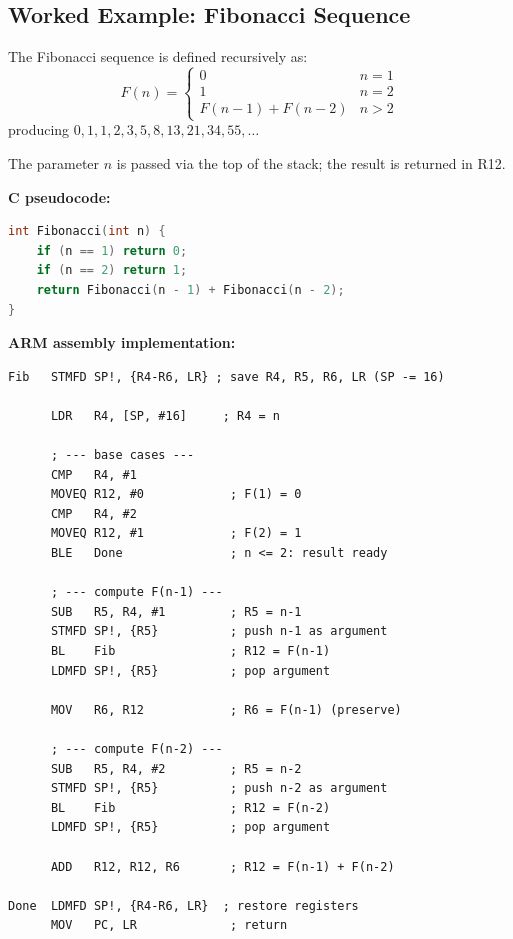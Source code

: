 \documentclass[11pt, a4paper, notitlepage]{report}
\theoremstyle{definition}
\theoremstyle{remark}
\theoremstyle{definition}
\begin{document}
\subsection{Worked Example: Fibonacci Sequence}

The Fibonacci sequence is defined recursively as:
\[
  F(n) = \begin{cases}
    0 & n = 1 \\
    1 & n = 2 \\
    F(n-1) + F(n-2) & n > 2
  \end{cases}
\]
producing $0, 1, 1, 2, 3, 5, 8, 13, 21, 34, 55, \ldots$

The parameter $n$ is passed via the top of the stack; the result is returned in R12.

\textbf{C pseudocode:}

\begin{lstlisting}[language=C]
int Fibonacci(int n) {
    if (n == 1) return 0;
    if (n == 2) return 1;
    return Fibonacci(n - 1) + Fibonacci(n - 2);
}
\end{lstlisting}

\textbf{ARM assembly implementation:}

\begin{lstlisting}
Fib   STMFD SP!, {R4-R6, LR} ; save R4, R5, R6, LR (SP -= 16)

      LDR   R4, [SP, #16]     ; R4 = n

      ; --- base cases ---
      CMP   R4, #1
      MOVEQ R12, #0            ; F(1) = 0
      CMP   R4, #2
      MOVEQ R12, #1            ; F(2) = 1
      BLE   Done               ; n <= 2: result ready

      ; --- compute F(n-1) ---
      SUB   R5, R4, #1         ; R5 = n-1
      STMFD SP!, {R5}          ; push n-1 as argument
      BL    Fib                ; R12 = F(n-1)
      LDMFD SP!, {R5}          ; pop argument

      MOV   R6, R12            ; R6 = F(n-1) (preserve)

      ; --- compute F(n-2) ---
      SUB   R5, R4, #2         ; R5 = n-2
      STMFD SP!, {R5}          ; push n-2 as argument
      BL    Fib                ; R12 = F(n-2)
      LDMFD SP!, {R5}          ; pop argument

      ADD   R12, R12, R6       ; R12 = F(n-1) + F(n-2)

Done  LDMFD SP!, {R4-R6, LR}  ; restore registers
      MOV   PC, LR             ; return
\end{lstlisting}
\end{document}

